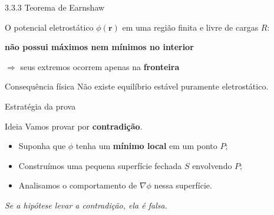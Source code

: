 \documentclass[aspectratio=169,11pt]{beamer}
\begin{document}
\begin{frame}{3.3.3 Teorema de Earnshaw}
\begin{block}{}
O potencial eletrostático $\phi(\mathbf r)$ em uma região finita e livre de cargas $R$:

\begin{center}
\textbf{não possui máximos nem mínimos no interior}
\end{center}

\pause

\begin{center}
$\Rightarrow$ seus extremos ocorrem apenas na \textbf{fronteira}
\end{center}
\end{block}

\pause

\begin{alertblock}{Consequência física}
Não existe equilíbrio estável puramente eletrostático.
\end{alertblock}
\end{frame}

\begin{frame}{Estratégia da prova}
\begin{block}{Ideia}
Vamos provar por \textbf{contradição}.
\end{block}

\pause

\begin{itemize}
\item Suponha que $\phi$ tenha um \textbf{mínimo local} em um ponto $P$;
\item Construímos uma pequena superfície fechada $S$ envolvendo $P$;
\item Analisamos o comportamento de $\nabla \phi$ nessa superfície.
\end{itemize}

\pause

\begin{center}
\textit{Se a hipótese levar a contradição, ela é falsa.}
\end{center}
\end{frame}
\end{document}
